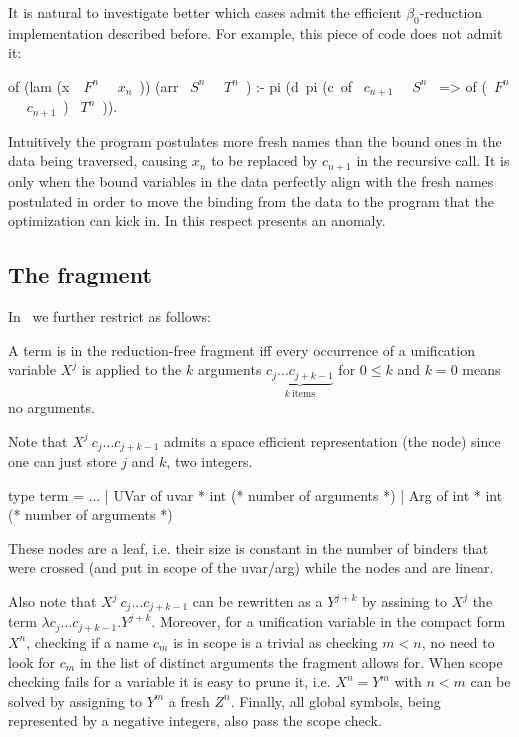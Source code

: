 \documentclass[a4paper, 11pt]{book}
\begin{document}
It is natural to investigate better which cases admit the efficient $\beta_0$-reduction
implementation described before. For example, this piece of code does not
admit it:

\begin{elpicode}
of (lam (x\ ~$F^n$~ ~$x_n$~)) (arr ~$S^n$~ ~$T^n$~) :-
  pi (d\ pi (c\ of ~$c_{n+1}$~ ~$S^n$~ => of (~$F^n$~ ~$c_{n+1}$~) ~$T^n$~)).
\end{elpicode}

\noindent
Intuitively the program postulates more fresh names than the bound ones
in the data being traversed, causing $x_n$ to be replaced by $c_{n+1}$
in the recursive call.
It is only when the bound variables in the data perfectly align with the fresh
names postulated in order to move the binding from the data to the program that
the optimization can kick in. In this respect 
presents an anomaly.

\subsection{The \thefragment fragment}\label{sec:llambo}

In~\cite{dunchev15lpar} we further restrict \theotherfragment as follows:

\begin{definition}
A term is in the reduction-free fragment \thefragment
iff every occurrence of a unification variable $X^j$
is applied to the $k$ arguments $\underbrace{c_j \ldots c_{j + k-1}}_{k~\mathrm{items}}$
for $0 \leq k$ and $k=0$ means no arguments.
\end{definition}

Note that $X^j\ c_j \ldots c_{j + k-1}$ admits a space efficient
representation (the  node) since one can just
store $j$ and $k$, two integers.

\begin{ocamlcode}
type term =
  ...
  | UVar of uvar * int (* number of arguments *)
  | Arg  of int  * int (* number of arguments *)
\end{ocamlcode}

\noindent
These nodes are a leaf, i.e. their size is constant in the
number of binders that were crossed (and put in scope of the uvar/arg)
while the nodes  and  are linear.

Also note that $X^j\ c_j \ldots c_{j + k-1}$ can be rewritten
as a $Y^{j+k}$ by assining to $X^j$ the term $\lambda c_j \ldots c_{j + k-1}. Y^{j+k}$.
Moreover, for a unification variable in the compact form $X^n$,
checking if a name $c_m$ is in scope is a trivial as checking
$m < n$, no need to look for $c_m$ in the list of distinct arguments
the \theotherfragment fragment allows for.
When scope checking fails for a variable it is easy to
prune it, i.e. $X^n = Y^m$ with $n < m$ can be solved by assigning to $Y^m$
a fresh $Z^n$.
Finally, all global symbols, being
represented by a negative integers, also pass the scope check.
\end{document}
